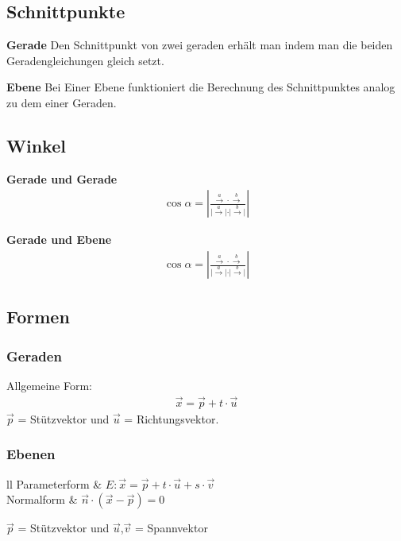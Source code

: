 \documentclass[german]{latex4ei/latex4ei_sheet}
\begin{document}
\begin{sectionbox}
\subsection{Schnittpunkte}
\begin{minipage}{0.49\textwidth}
\textbf{Gerade}
Den Schnittpunkt von zwei geraden erhält man indem man die beiden Geradengleichungen gleich setzt.
\end{minipage}
\begin{minipage}{0.49\textwidth}
\textbf{Ebene}
Bei Einer Ebene funktioniert die Berechnung des Schnittpunktes analog zu dem einer Geraden.
\end{minipage}

\subsection{Winkel}
\begin{minipage}{0.49\textwidth}
\textbf{Gerade und Gerade}
\begin{align*}
\cos \alpha = \left| \frac{\xrightarrow{a} \cdot \xrightarrow{b} }{\vert \xrightarrow{a} \vert \cdot \vert \xrightarrow{b} \vert} \right|
\end{align*}
\end{minipage}
\begin{minipage}{0.49\textwidth}
\textbf{Gerade und Ebene}
\begin{align*}
\cos \alpha = \left| \frac{\xrightarrow{a} \cdot \xrightarrow{b} }{\vert \xrightarrow{a} \vert \cdot \vert \xrightarrow{b} \vert} \right|
\end{align*}
\end{minipage}

\subsection{Formen}
\subsubsection{Geraden}
Allgemeine Form: 
\begin{align*}
\overrightarrow{x} = \overrightarrow{p} + t \cdot \overrightarrow{u}
\end{align*} 
$\overrightarrow{p}$ = Stützvektor und $\overrightarrow{u}$ = Richtungsvektor.

\subsubsection{Ebenen}
\begin{tablebox}{ll}
Parameterform & 
$E:\overrightarrow{x} = \overrightarrow{p} + t \cdot \overrightarrow{u} + s \cdot \overrightarrow{v} $ \\
Normalform & $\overrightarrow{n} \cdot \left( \overrightarrow{x} - \overrightarrow{p} \right) = 0 $\\
\end{tablebox}
$\overrightarrow{p}$ = Stützvektor und $\overrightarrow{u}$,$\overrightarrow{v}$ = Spannvektor


\end{sectionbox}
\end{document}
